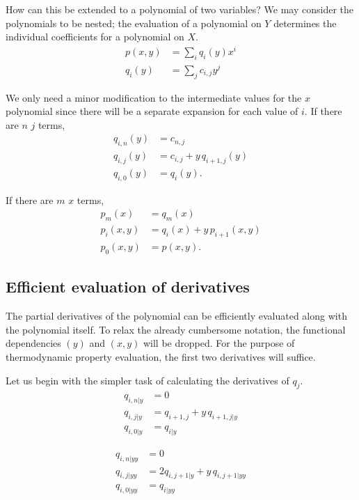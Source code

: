 \documentclass[twocolumn,letterpaper,11pt]{article}
\begin{document}
How can this be extended to a polynomial of two variables?  We may consider the polynomials to be nested; the evaluation of a polynomial on $Y$ determines the individual coefficients for a polynomial on $X$.
\begin{align}
p(x,y) &= \sum_i q_i(y) x^i\\
q_i(y) &= \sum_j c_{i,j} y^j
\end{align}

We only need a minor modification to the intermediate values for the $x$ polynomial since there will be a separate expansion for each value of $i$.  If there are $n$ $j$ terms,
\begin{subequations}
\begin{align}
q_{i,n}(y) &= c_{n,j}\\
q_{i,j}(y) &= c_{i,j} + y\,q_{i+1,j}(y)\\
q_{i,0}(y) &= q_i(y).
\end{align}
\end{subequations}

If there are $m$ $x$ terms,
\begin{subequations}
\begin{align}
p_m(x) &= q_m(x)\\
p_i(x,y) &= q_i(x) + y\,p_{i+1}(x,y)\\
p_0(x,y) &= p(x,y).
\end{align}
\end{subequations}

\subsection{Efficient evaluation of derivatives}
The partial derivatives of the polynomial can be efficiently evaluated along with the polynomial itself. To relax the already cumbersome notation, the functional dependencies $(y)$ and $(x,y)$ will be dropped.  For the purpose of thermodynamic property evaluation, the first two derivatives will suffice.

Let us begin with the simpler task of calculating the derivatives of $q_j$.
\begin{subequations}
\begin{align}
q_{i,n|y} &= 0\\
q_{i,j|y} &= q_{i+1,j} + y\,q_{i+1,j|y}\\
q_{i,0|y} &= q_{i|y}
\end{align}
\end{subequations}

\begin{subequations}
\begin{align}
q_{i,n|yy} &= 0\\
q_{i,j|yy} &= 2 q_{i,j+1|y} + y\,q_{i,j+1|yy}\\
q_{i,0|yy} &= q_{i|yy}
\end{align}
\end{subequations}
\end{document}
